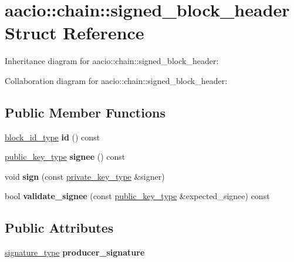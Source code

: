 \hypertarget{structaacio_1_1chain_1_1signed__block__header}{}\section{aacio\+:\+:chain\+:\+:signed\+\_\+block\+\_\+header Struct Reference}
\label{structaacio_1_1chain_1_1signed__block__header}


Inheritance diagram for aacio\+:\+:chain\+:\+:signed\+\_\+block\+\_\+header\+:


Collaboration diagram for aacio\+:\+:chain\+:\+:signed\+\_\+block\+\_\+header\+:
\subsection*{Public Member Functions}
\begin{DoxyCompactItemize}
\item 
\mbox{\label{structaacio_1_1chain_1_1signed__block__header_a22981510ad435f76e87a8afffefb3d7d}} 
\mbox{\hyperlink{classfc_1_1sha256}{block\+\_\+id\+\_\+type}} {\bfseries id} () const
\item 
\mbox{\label{structaacio_1_1chain_1_1signed__block__header_a07e841965e5853c4c0ad2e6b34f02ade}} 
\mbox{\hyperlink{classfc_1_1crypto_1_1public__key}{public\+\_\+key\+\_\+type}} {\bfseries signee} () const
\item 
\mbox{\label{structaacio_1_1chain_1_1signed__block__header_ade8da64c77e54b199990d7842ea17a6b}} 
void {\bfseries sign} (const \mbox{\hyperlink{classfc_1_1crypto_1_1private__key}{private\+\_\+key\+\_\+type}} \&signer)
\item 
\mbox{\label{structaacio_1_1chain_1_1signed__block__header_abc2b94d59d16ea7d86a78458bff30b64}} 
bool {\bfseries validate\+\_\+signee} (const \mbox{\hyperlink{classfc_1_1crypto_1_1public__key}{public\+\_\+key\+\_\+type}} \&expected\+\_\+signee) const
\end{DoxyCompactItemize}
\subsection*{Public Attributes}
\begin{DoxyCompactItemize}
\item 
\mbox{\label{structaacio_1_1chain_1_1signed__block__header_a579452ade0124325051805937eef830d}} 
\mbox{\hyperlink{classfc_1_1crypto_1_1signature}{signature\+\_\+type}} {\bfseries producer\+\_\+signature}
\end{DoxyCompactItemize}
